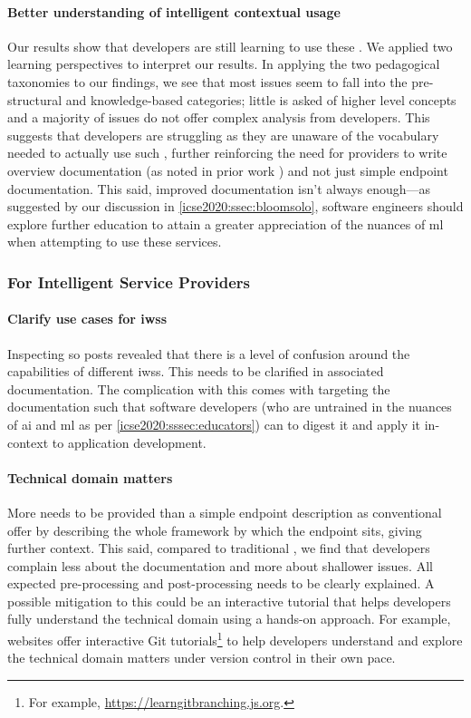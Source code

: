 \paragraph{Better understanding of intelligent  contextual usage} Our results show that developers are still learning to use these . We applied two learning perspectives to interpret our results. In applying the two pedagogical taxonomies to our findings, we see that most issues seem to fall into the pre-structural and knowledge-based categories; little is asked of higher level concepts and a majority of issues do not offer complex analysis from developers. This suggests that developers are struggling as they are unaware of the vocabulary needed to actually use such , further reinforcing the need for  providers to write overview documentation (as noted in prior work \citep{Cummaudo:2019esem}) and not just simple endpoint documentation. This said, improved documentation isn't always enough---as suggested by our discussion in \cref{icse2020:ssec:bloomsolo}, software engineers should explore further education to attain a greater appreciation of the nuances of \gls{ml} when attempting to use these services.

\subsubsection{For Intelligent Service Providers}

\paragraph{Clarify use cases for \glspl{iws}} Inspecting \gls{so} posts revealed that there is a level of confusion around the capabilities of different \glspl{iws}. This needs to be clarified in associated  documentation.
The complication with this comes with targeting the documentation such that software developers (who are untrained in the nuances of \gls{ai} and \gls{ml} as per \cref{icse2020:sssec:educators}) can to digest it and apply it in-context to application development.

\paragraph{Technical domain matters} More needs to be provided than a simple endpoint description as conventional  offer by describing the whole framework by which the endpoint sits, giving further context. This said, compared to traditional , we find that developers complain less about the documentation and more about shallower issues. All expected pre-processing and post-processing needs to be clearly explained.
A possible mitigation to this could be an interactive tutorial that helps developers fully understand the technical domain using a hands-on approach. For example, websites offer interactive Git tutorials\footnote{For example, \url{https://learngitbranching.js.org}.} to help developers understand and explore the technical domain matters under version control in their own pace.

